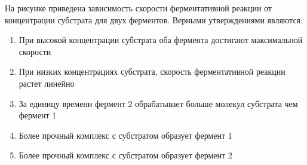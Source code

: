 
На рисунке приведена
зависимость скорости ферментативной реакции от концентрации субстрата для двух
ферментов. Верными утверждениями являются:


\begin{enumerate}
    \item При высокой концентрации субстрата оба фермента достигают максимальной скорости
    \item При низких концентрациях субстрата, скорость ферментативной реакции растет линейно
    \item За единицу времени фермент 2 обрабатывает больше молекул субстрата чем фермент 1
    \item Более прочный комплекс с субстратом образует фермент 1
    \item Более прочный комплекс с субстратом образует фермент 2
\end{enumerate}

